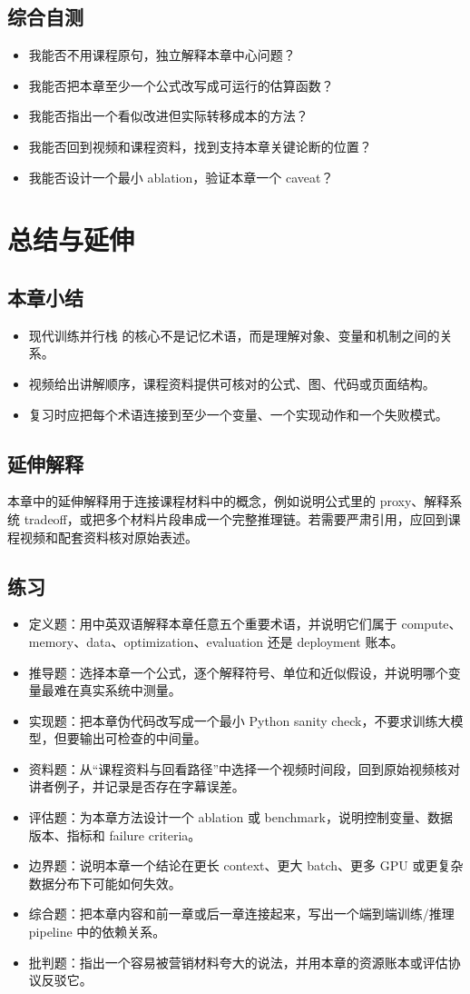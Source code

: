 \documentclass[a4paper]{article}
\begin{document}
\subsection{综合自测}
\begin{itemize}
\item 我能否不用课程原句，独立解释本章中心问题？
\item 我能否把本章至少一个公式改写成可运行的估算函数？
\item 我能否指出一个看似改进但实际转移成本的方法？
\item 我能否回到视频和课程资料，找到支持本章关键论断的位置？
\item 我能否设计一个最小 ablation，验证本章一个 caveat？
\end{itemize}
\section{总结与延伸}
\subsection{本章小结}
\begin{itemize}
\item 现代训练并行栈 的核心不是记忆术语，而是理解对象、变量和机制之间的关系。
\item 视频给出讲解顺序，课程资料提供可核对的公式、图、代码或页面结构。
\item 复习时应把每个术语连接到至少一个变量、一个实现动作和一个失败模式。
\end{itemize}
\subsection{延伸解释}
本章中的延伸解释用于连接课程材料中的概念，例如说明公式里的 proxy、解释系统 tradeoff，或把多个材料片段串成一个完整推理链。若需要严肃引用，应回到课程视频和配套资料核对原始表述。
\subsection{练习}
\begin{itemize}
\item 定义题：用中英双语解释本章任意五个重要术语，并说明它们属于 compute、memory、data、optimization、evaluation 还是 deployment 账本。
\item 推导题：选择本章一个公式，逐个解释符号、单位和近似假设，并说明哪个变量最难在真实系统中测量。
\item 实现题：把本章伪代码改写成一个最小 Python sanity check，不要求训练大模型，但要输出可检查的中间量。
\item 资料题：从“课程资料与回看路径”中选择一个视频时间段，回到原始视频核对讲者例子，并记录是否存在字幕误差。
\item 评估题：为本章方法设计一个 ablation 或 benchmark，说明控制变量、数据版本、指标和 failure criteria。
\item 边界题：说明本章一个结论在更长 context、更大 batch、更多 GPU 或更复杂数据分布下可能如何失效。
\item 综合题：把本章内容和前一章或后一章连接起来，写出一个端到端训练/推理 pipeline 中的依赖关系。
\item 批判题：指出一个容易被营销材料夸大的说法，并用本章的资源账本或评估协议反驳它。
\end{itemize}
\end{document}
